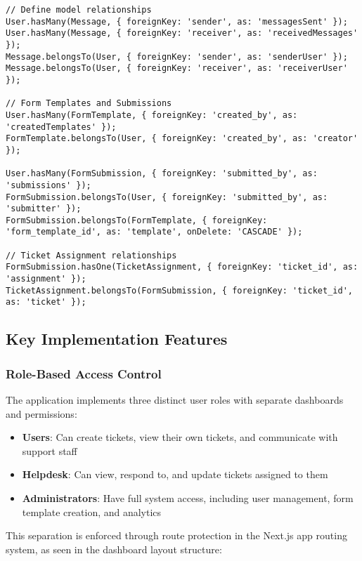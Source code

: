 \documentclass[12pt,a4paper]{article}
\begin{document}
\lstset{language=JavaScript}
\begin{lstlisting}[caption=Database Model Relationships (from models/index.js)]
// Define model relationships
User.hasMany(Message, { foreignKey: 'sender', as: 'messagesSent' });
User.hasMany(Message, { foreignKey: 'receiver', as: 'receivedMessages' });
Message.belongsTo(User, { foreignKey: 'sender', as: 'senderUser' });
Message.belongsTo(User, { foreignKey: 'receiver', as: 'receiverUser' });

// Form Templates and Submissions
User.hasMany(FormTemplate, { foreignKey: 'created_by', as: 'createdTemplates' });
FormTemplate.belongsTo(User, { foreignKey: 'created_by', as: 'creator' });

User.hasMany(FormSubmission, { foreignKey: 'submitted_by', as: 'submissions' });
FormSubmission.belongsTo(User, { foreignKey: 'submitted_by', as: 'submitter' });
FormSubmission.belongsTo(FormTemplate, { foreignKey: 'form_template_id', as: 'template', onDelete: 'CASCADE' });

// Ticket Assignment relationships
FormSubmission.hasOne(TicketAssignment, { foreignKey: 'ticket_id', as: 'assignment' });
TicketAssignment.belongsTo(FormSubmission, { foreignKey: 'ticket_id', as: 'ticket' });
\end{lstlisting}

\subsection{Key Implementation Features}

\subsubsection{Role-Based Access Control}

The application implements three distinct user roles with separate dashboards and permissions:

\begin{itemize}
    \item \textbf{Users}: Can create tickets, view their own tickets, and communicate with support staff
    \item \textbf{Helpdesk}: Can view, respond to, and update tickets assigned to them
    \item \textbf{Administrators}: Have full system access, including user management, form template creation, and analytics
\end{itemize}

This separation is enforced through route protection in the Next.js app routing system, as seen in the dashboard layout structure:
\end{document}
